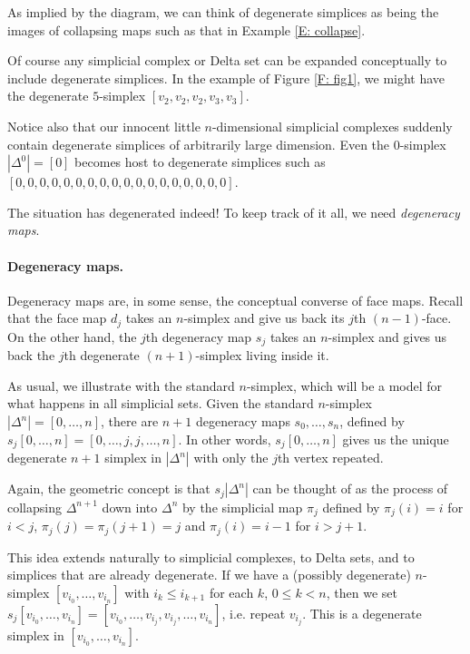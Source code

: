 \documentclass[12pt]{article}
\theoremstyle{plain}
\theoremstyle{definition}
\begin{document}
As implied by the diagram, we can think of degenerate simplices as being the images of collapsing maps such as that in Example \ref{E: collapse}.




Of course any simplicial complex or Delta set can be expanded conceptually to include degenerate simplices. In the example of Figure \ref{F: fig1}, we might have the degenerate $5$-simplex $[v_2,v_2, v_2,v_3, v_3]$.

Notice also that our innocent little $n$-dimensional simplicial complexes suddenly contain degenerate simplices of arbitrarily large dimension. Even the $0$-simplex $|\Delta^0|=[0]$ becomes host to degenerate simplices such as $[0,0,0,0,0,0,0,0,0,0,0,0,0,0,0,0,0,0]$. 

The situation has degenerated indeed! To keep track of it all, we need \emph{degeneracy maps}.
















\paragraph{Degeneracy maps.}

Degeneracy maps are, in some sense, the conceptual converse of face maps. Recall that the face map $d_j$ takes an $n$-simplex and give us back its $j$th $(n-1)$-face. On the other hand, the $j$th degeneracy map $s_j$ takes an $n$-simplex and gives us back the $j$th degenerate $(n+1)$-simplex living inside it. 

As usual, we illustrate with the standard $n$-simplex, which will be a model for what happens in all simplicial sets. Given the standard $n$-simplex $|\Delta^n|=[0,\ldots, n]$, there are $n+1$ degeneracy maps $s_0,\ldots, s_n$, defined by $s_j[0,\ldots, n]=[0,\ldots, j,j,\ldots, n]$. In other words, $s_j[0,\ldots,n]$ gives us the unique degenerate $n+1$ simplex in $|\Delta^n|$ with only the $j$th vertex repeated.


Again, the geometric concept is that $s_j|\Delta^n|$ can be thought of as the process of collapsing $\Delta^{n+1}$ down into $\Delta^n$ by the simplicial map $\pi_j$ defined by $\pi_j(i)=i$ for $i<j$, $\pi_j(j)=\pi_j(j+1)=j$ and $\pi_j(i)=i-1$ for $i>j+1$. 


This idea extends naturally to simplicial complexes, to Delta sets, and to simplices that are already degenerate. If we have a  (possibly degenerate) $n$-simplex $[v_{i_0},\ldots, v_{i_n}]$ with $i_k\leq i_{k+1}$ for each $k$, $0\leq k< n$, then we set $s_j[v_{i_0},\ldots, v_{i_n}]=[v_{i_0},\ldots, v_{i_j},v_{i_{j}},\ldots, v_{i_n}]$, i.e. repeat $v_{i_j}$. This is a degenerate simplex in $[v_{i_0},\ldots, v_{i_n}]$. 
\end{document}
